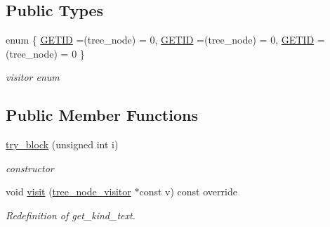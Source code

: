 \subsection*{Public Types}
\begin{DoxyCompactItemize}
\item 
enum \{ \hyperlink{structtry__block_a372ca42e71bdce60bb4a6371cb8d8e8aa9694346a225939a0a549ee1704f64c3d}{G\+E\+T\+ID} =(tree\+\_\+node) = 0, 
\hyperlink{structtry__block_a372ca42e71bdce60bb4a6371cb8d8e8aa9694346a225939a0a549ee1704f64c3d}{G\+E\+T\+ID} =(tree\+\_\+node) = 0, 
\hyperlink{structtry__block_a372ca42e71bdce60bb4a6371cb8d8e8aa9694346a225939a0a549ee1704f64c3d}{G\+E\+T\+ID} =(tree\+\_\+node) = 0
 \}\begin{DoxyCompactList}\small\item\em visitor enum \end{DoxyCompactList}
\end{DoxyCompactItemize}
\subsection*{Public Member Functions}
\begin{DoxyCompactItemize}
\item 
\hyperlink{structtry__block_a8d4bfdc125e53e31950f0d8941212af2}{try\+\_\+block} (unsigned int i)
\begin{DoxyCompactList}\small\item\em constructor \end{DoxyCompactList}\item 
void \hyperlink{structtry__block_aedc2ad7c024dea066c6d6d18f13dd736}{visit} (\hyperlink{classtree__node__visitor}{tree\+\_\+node\+\_\+visitor} $\ast$const v) const override
\begin{DoxyCompactList}\small\item\em Redefinition of get\+\_\+kind\+\_\+text. \end{DoxyCompactList}\end{DoxyCompactItemize}
